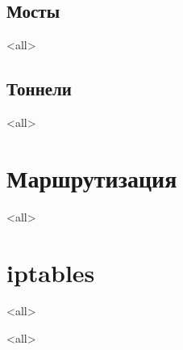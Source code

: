 \subsection{Мосты}
\mode<all>{}
\subsection{Тоннели}
\mode<all>{}

\section{Маршрутизация}
\mode<all>{}

\section{iptables}
\mode<all>{}


\mode<all>

